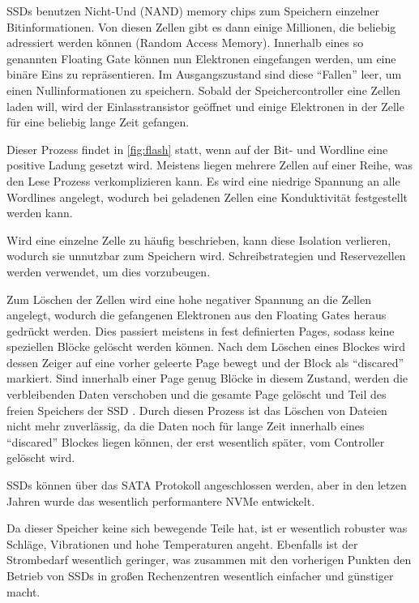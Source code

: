 SSDs benutzen Nicht-Und (NAND) memory chips zum Speichern einzelner Bitinformationen. Von diesen Zellen gibt es dann einige Millionen, die beliebig adressiert werden können (Random Access Memory). Innerhalb eines so genannten Floating Gate können nun Elektronen eingefangen werden, um eine binäre Eins zu repräsentieren. Im Ausgangszustand sind diese ``Fallen'' leer, um einen Nullinformationen zu speichern. Sobald der Speichercontroller eine Zellen laden will, wird der Einlasstransistor geöffnet und einige Elektronen in der Zelle für eine beliebig lange Zeit gefangen.

Dieser Prozess findet in \autoref{fig:flash} statt, wenn auf der Bit- und Wordline eine positive Ladung gesetzt wird. Meistens liegen mehrere Zellen auf einer Reihe, was den Lese Prozess verkomplizieren kann. Es wird eine niedrige Spannung an alle Wordlines angelegt, wodurch bei geladenen Zellen eine Konduktivität festgestellt werden kann. 

Wird eine einzelne Zelle zu häufig beschrieben, kann diese Isolation verlieren, wodurch sie unnutzbar zum Speichern wird. Schreibstrategien und Reservezellen werden verwendet, um dies vorzubeugen.	

Zum Löschen der Zellen wird eine hohe negativer Spannung an die Zellen angelegt, wodurch die gefangenen Elektronen aus den Floating Gates heraus gedrückt werden. Dies passiert meistens in fest definierten Pages, sodass keine speziellen Blöcke gelöscht werden können. Nach dem Löschen eines Blockes wird dessen Zeiger auf eine vorher geleerte Page bewegt und der Block als ``discared'' markiert. Sind innerhalb einer Page genug Blöcke in diesem Zustand, werden die verbleibenden Daten verschoben und die gesamte Page gelöscht und Teil des freien Speichers der SSD \parencite{kaufmann.2016}. 
Durch diesen Prozess ist das Löschen von Dateien nicht mehr zuverlässig, da die Daten noch für lange Zeit innerhalb eines ``discared'' Blockes liegen können, der erst wesentlich später, vom Controller gelöscht wird.

SSDs können über das SATA Protokoll angeschlossen werden, aber in den letzen Jahren wurde das wesentlich performantere NVMe entwickelt.

Da dieser Speicher keine sich bewegende Teile hat, ist er wesentlich robuster was Schläge, Vibrationen und hohe Temperaturen angeht. Ebenfalls ist der Strombedarf wesentlich geringer, was zusammen mit den vorherigen Punkten den Betrieb von SSDs in großen Rechenzentren wesentlich einfacher und günstiger macht.

